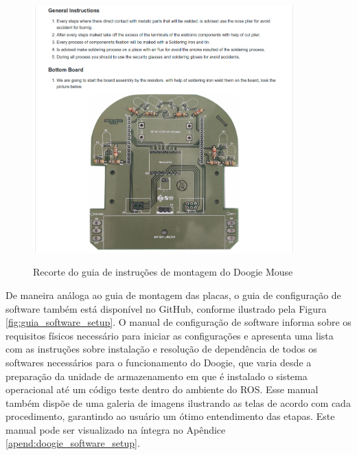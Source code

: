 \begin{figure}[H]
	\centering
	\caption{Recorte do guia de instruções de montagem do Doogie Mouse}
	\includegraphics[width=0.9\textwidth]
	{Figures/guia_hardware_setup}
	\label{fig:guia_hardware_setup}
\end{figure}

De maneira análoga ao guia de montagem das placas, o guia de configuração de software também está disponível no GitHub, conforme ilustrado pela Figura \ref{fig:guia_software_setup}. O manual de configuração de software informa sobre os requisitos físicos necessário para iniciar as configurações e apresenta uma lista com as instruções sobre instalação e resolução de dependência de todos os softwares necessários para o funcionamento do Doogie, que varia desde a preparação da unidade de armazenamento em que é instalado o sistema operacional até um código teste dentro do ambiente do ROS. Esse manual também dispõe de uma galeria de imagens ilustrando as telas de acordo com cada procedimento, garantindo ao usuário um ótimo entendimento das etapas. Este manual pode ser visualizado na íntegra no Apêndice \ref{apend:doogie_software_setup}.

